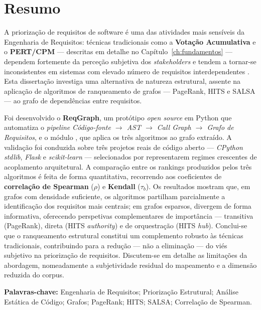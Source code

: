 \chapter*{Resumo}

A priorização de requisitos de software é uma das atividades mais
sensíveis da Engenharia de Requisitos: técnicas tradicionais como a
\textbf{Votação Acumulativa} e o \textbf{PERT/CPM} --- descritas em
detalhe no Capítulo~\ref{ch:fundamentos} --- dependem fortemente da
perceção subjetiva dos \textit{stakeholders} e tendem a tornar-se
inconsistentes em sistemas com elevado número de requisitos
interdependentes \parencite{karlsson2002, silva2018}. Esta dissertação
investiga uma alternativa de natureza estrutural, assente na aplicação
de algoritmos de ranqueamento de grafos --- PageRank, HITS e SALSA ---
ao grafo de dependências entre requisitos.

Foi desenvolvido o \textbf{ReqGraph}, um protótipo \emph{open source}
em Python que automatiza o \textit{pipeline}
\emph{Código-fonte \(\rightarrow\) AST \(\rightarrow\) Call Graph
\(\rightarrow\) Grafo de Requisitos}, e o módulo , que
aplica os três algoritmos ao grafo extraído. A validação foi conduzida
sobre três projetos reais de código aberto --- \emph{CPython stdlib},
\emph{Flask} e \emph{scikit-learn} --- selecionados por
representarem regimes crescentes de acoplamento arquitetural. A
comparação entre os rankings produzidos pelos três algoritmos é feita
de forma quantitativa, recorrendo aos coeficientes de
\textbf{correlação de Spearman} (\(\rho\)) e \textbf{Kendall}
(\(\tau_b\)). Os resultados mostram que, em grafos com densidade
suficiente, os algoritmos partilham parcialmente a identificação dos
requisitos mais centrais; em grafos esparsos, divergem de forma
informativa, oferecendo perspetivas complementares de importância
--- transitiva (PageRank), direta (HITS \emph{authority}) e de
orquestração (HITS \emph{hub}). Conclui-se que o ranqueamento estrutural
constitui um complemento robusto às técnicas tradicionais, contribuindo
para a redução --- não a eliminação --- do viés subjetivo na priorização
de requisitos. Discutem-se em detalhe as limitações da abordagem,
nomeadamente a subjetividade residual do mapeamento
 e a dimensão reduzida do corpus.

\vspace{0.3cm}
\noindent\textbf{Palavras-chave:} Engenharia de Requisitos; Priorização
Estrutural; Análise Estática de Código; Grafos; PageRank; HITS; SALSA;
Correlação de Spearman.
